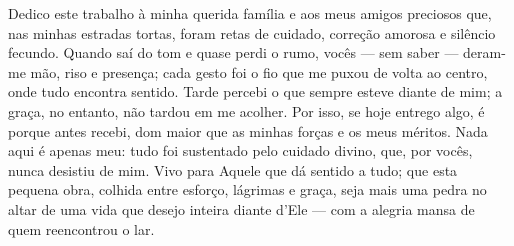 \begin{dedicatoria}
   \vspace*{\fill}

{%
	\noindent\hspace{.5\textwidth}
	{\begin{minipage}{.5\textwidth}
			\begin{flushleft}
				Dedico este trabalho à minha querida família e aos meus amigos preciosos que, nas minhas estradas tortas, foram retas de cuidado, correção amorosa e silêncio fecundo. Quando saí do tom e quase perdi o rumo, vocês — sem saber — deram-me mão, riso e presença; cada gesto foi o fio que me puxou de volta ao centro, onde tudo encontra sentido. Tarde percebi o que sempre esteve diante de mim; a graça, no entanto, não tardou em me acolher. Por isso, se hoje entrego algo, é porque antes recebi, dom maior que as minhas forças e os meus méritos. Nada aqui é apenas meu: tudo foi sustentado pelo cuidado divino, que, por vocês, nunca desistiu de mim. Vivo para Aquele que dá sentido a tudo; que esta pequena obra, colhida entre esforço, lágrimas e graça, seja mais uma pedra no altar de uma vida que desejo inteira diante d’Ele — com a alegria mansa de quem reencontrou o lar.
			\end{flushleft}
	\end{minipage}}%
\vspace*{3cm}
}%

\end{dedicatoria}
